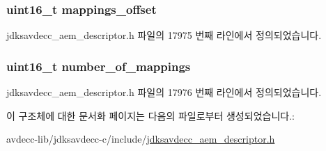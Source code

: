 \subsubsection[{\texorpdfstring{mappings\+\_\+offset}{mappings_offset}}]{\setlength{\rightskip}{0pt plus 5cm}uint16\+\_\+t mappings\+\_\+offset}\hypertarget{structjdksavdecc__descriptor__video__unit__map_ac91a41273e32c7bf86ca390838721642}{}\label{structjdksavdecc__descriptor__video__unit__map_ac91a41273e32c7bf86ca390838721642}


jdksavdecc\+\_\+aem\+\_\+descriptor.\+h 파일의 17975 번째 라인에서 정의되었습니다.

\subsubsection[{\texorpdfstring{number\+\_\+of\+\_\+mappings}{number_of_mappings}}]{\setlength{\rightskip}{0pt plus 5cm}uint16\+\_\+t number\+\_\+of\+\_\+mappings}\hypertarget{structjdksavdecc__descriptor__video__unit__map_ac7db472c5622ef473d5d0a5c416d5531}{}\label{structjdksavdecc__descriptor__video__unit__map_ac7db472c5622ef473d5d0a5c416d5531}


jdksavdecc\+\_\+aem\+\_\+descriptor.\+h 파일의 17976 번째 라인에서 정의되었습니다.



이 구조체에 대한 문서화 페이지는 다음의 파일로부터 생성되었습니다.\+:\begin{DoxyCompactItemize}
\item 
avdecc-\/lib/jdksavdecc-\/c/include/\hyperlink{jdksavdecc__aem__descriptor_8h}{jdksavdecc\+\_\+aem\+\_\+descriptor.\+h}\end{DoxyCompactItemize}
